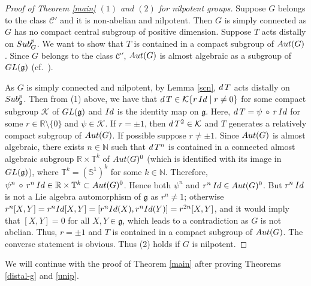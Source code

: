 \documentclass{amsart}
\numberwithin{equation}{section}
\newcommand{\Aut}{{\rm Aut}}
\newcommand{\mbb}{\mathbb}
\newcommand{\N}{{\mathbb N}}
\newcommand{\R}{{\mathbb R}}
\newcommand{\gf}{{\mathfrak g}}
\newcommand{\K}{{\mathcal K}}
\newcommand{\spg}{{\rm Sub}^p_G}
\newcommand{\spp}{{\rm Sub}^{p}}
\newcommand{\du}{{\rm d\,}}
\newcommand{\Id}{{\rm Id}}
\newcommand{\GL}{{\rm GL}}
\theoremstyle{remark}
\newcommand{\cp}{{\mathcal{C}'}}
\begin{document}
\begin{proof}[Proof of Theorem {\rm \ref{main}} $(1)$ and $(2)$ for nilpotent groups]
\smallskip
{} Suppose $G$ belongs to the class $\cp$ and it is non-abelian and nilpotent. Then
 $G$ is simply connected as $G$ has no compact central subgroup of positive dimension.
Suppose $T$ acts distally on $\spg$. We want to show 
that $T$ is contained in a compact subgroup of $\Aut(G)$. Since $G$ belongs to the class $\cp$, 
$\Aut(G)$ is almost algebraic as a subgroup of $\GL(\gf)$ (cf.\ \cite{D}). 

As $G$ is simply connected and nilpotent, by Lemma \ref{scn}, $\du T$ acts 
distally on $\spp_\gf$. Then from (1) above, we have that $\du T\in \K\{r\,\Id\mid r\ne 0\}$ 
for some compact subgroup $\K$ of $\GL(\gf)$ and $\Id$ is the identity map on $\gf$. 
Here, $\du T=\psi\,\circ\, r\,\Id$ for some $r\in \R\setminus\{0\}$ and $\psi\in \K$. If $r=\pm 1$, then 
$\du T^2\in \K$ and $T$ generates a relatively compact subgroup of $\Aut(G)$. If possible suppose 
$r\ne\pm 1$. Since $\Aut(G)$ is almost algebraic, there exists $n\in\N$ such that
$\du T^n$ is contained in a connected almost algebraic subgroup $\R\times \mbb T^k$ of 
$\Aut(G)^0$ (which is identified with its image in $\GL(\gf)$), where $\mbb T^k=(\mbb S^1)^k$ 
for some $k\in\N$. Therefore, $\psi^n\,\circ\, r^n\,\Id\in \R\times\mbb T^k\subset \Aut(G)^0$. 
Hence both $\psi^n$ and $r^n\,\Id\in \Aut(G)^0$. But $r^n\,\Id$ is not a Lie algebra automorphism of $\gf$ 
as $r^n\ne 1$; otherwise $r^n[X,Y]=r^n\Id[X,Y]=[r^n\Id(X),r^n\Id(Y)]=r^{2n}[X,Y]$, and it would imply that 
$[X,Y]=0$ for all $X,Y\in\gf$, which leads to a contradiction as $G$ is not abelian. Thus, $r=\pm 1$ and 
$T$ is contained in a compact subgroup of $\Aut(G)$. The converse statement is obvious. 
Thus (2) holds if $G$ is nilpotent.
\end{proof} 

We will continue with the proof of Theorem \ref{main} after proving Theorems \ref{distal-g} and \ref{unip}.  
\end{document}
